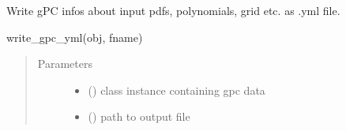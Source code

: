 \documentclass[letterpaper,10pt,english,openany,oneside]{sphinxmanual}
\begin{document}

\begin{fulllineitems}
\label{\detokenize{pygpc:pygpc.rw.write_gpc_yml}}
Write gPC infos about input pdfs, polynomials, grid etc. as .yml file.

write\_gpc\_yml(obj, fname)
\begin{quote}\begin{description}
\item[{Parameters}] \leavevmode\begin{itemize}
\item {} 
 ({\hyperref[\detokenize{pygpc:pygpc.gpc.gPC}]{}}) \textendash{} class instance containing gpc data

\item {} 
 () \textendash{} path to output file

\end{itemize}

\end{description}\end{quote}

\end{fulllineitems}

\end{document}
